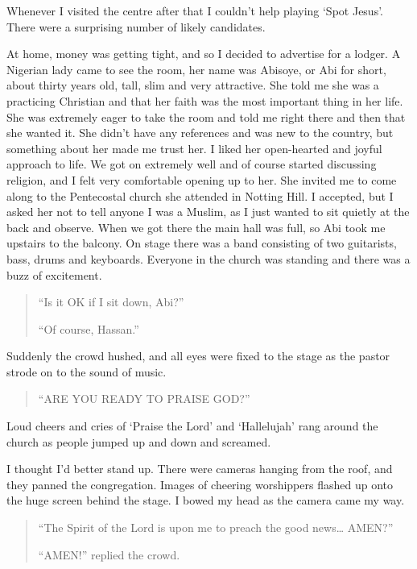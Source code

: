 \documentclass[12pt]{memoir}
\newcommand{\cor}[2]{#2} %
\begin{document}
Whenever I visited the centre after that I couldn’t help playing ‘Spot Jesus’.
There were a surprising number of likely candidates.

At home, money was getting tight, and so I decided to advertise for a lodger.
A Nigerian lady came to see the room, her name was Abisoye,
or Abi for short, about thirty years old, tall, slim and very attractive.
She told me she was a practicing Christian
and that her faith was the most important thing in her life.
She was extremely eager to take the room and told me right there
and then that she wanted it.
She didn’t have any references and was new to the country,
but something about her made me trust\cor{ed}{} her.
I liked her open-hearted and joyful approach to life.
We got on extremely well and of course started discussing religion,
and I felt very comfortable opening up to her.
She invited me to come along to the Pentecostal church
she attended in Notting Hill.
I accepted, but I asked her not to tell anyone I was a Muslim,
as I just wanted to sit quietly at the back and observe.
When we got there the main hall was full,
so Abi took me upstairs to the balcony.
On stage there was a band consisting of two guitarists,
bass, drums and keyboards.
Everyone in the church was standing and there was a buzz of excitement.

\begin{quote}
“Is it OK if I sit down, Abi?”

“Of course, Hassan.”
\end{quote}

Suddenly the crowd hushed, and all eyes were fixed to the stage
as the pastor strode on to the sound of music.

\begin{quote}
“ARE YOU READY TO PRAISE GOD?”
\end{quote}

Loud cheers and cries of ‘Praise the Lord’ and ‘Hallelujah’
rang around the church as people jumped up and down and screamed.

I thought I’d better stand up.
There were cameras hanging from the roof, and they panned the congregation.
Images of cheering worshippers flashed up
onto the huge screen behind the stage.
I bowed my head as the camera came my way.

\begin{quote}
“The Spirit of the Lord is upon me to preach the good news… AMEN?”

“AMEN!” replied the crowd.
\end{quote}
\end{document}
